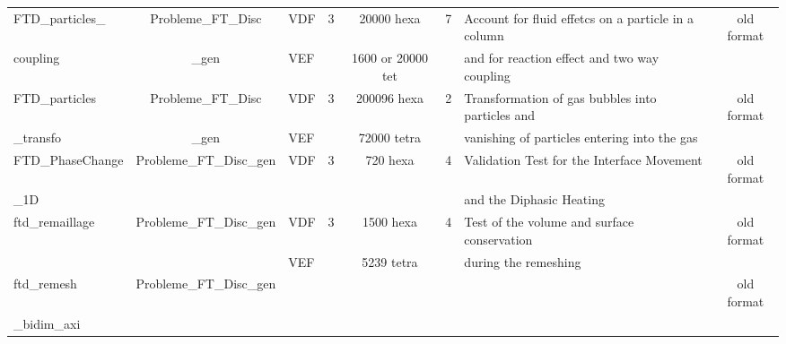 \begin{table}[H]
\begin{centering}
\begin{tabular}{lclccclc}
\hline
\rowcolor{Orchid!10}FTD\_particles\_ & Probleme\_FT\_Disc & VDF & 3 & 20000 hexa & 7 & Account for fluid effetcs on a particle in a column  & old format \\ 
\rowcolor{Orchid!10}coupling & \_gen & VEF & & 1600 or 20000 tet & & and for reaction effect and two way coupling & \\
\hline
\rowcolor{Orchid!10}FTD\_particles & Probleme\_FT\_Disc & VDF & 3 & 200096 hexa & 2 & Transformation of gas bubbles into particles and & old format \\ 
\rowcolor{Orchid!10}\_transfo & \_gen & VEF &  & 72000 tetra & & vanishing of particles entering into the gas & \\
\hline
\rowcolor{Orchid!10}FTD\_PhaseChange & Probleme\_FT\_Disc\_gen & VDF & 3 & 720 hexa & 4 & Validation Test for the Interface Movement & old format \\
\rowcolor{Orchid!10}\_1D & & & & & & and the Diphasic Heating & \\
\hline
\rowcolor{Orchid!10}ftd\_remaillage & Probleme\_FT\_Disc\_gen & VDF & 3 & 1500 hexa & 4 & Test of the volume and surface conservation & old format \\ 
\rowcolor{Orchid!10} & & VEF & & 5239 tetra & & during the remeshing & \\
\hline
\rowcolor{Orchid!10}ftd\_remesh & Probleme\_FT\_Disc\_gen & & & & & & old format \\ 
\rowcolor{Orchid!10} \_bidim\_axi & & & & & & & \\
\hline
\end{tabular}
\end{centering}
\end{table}

\newpage

